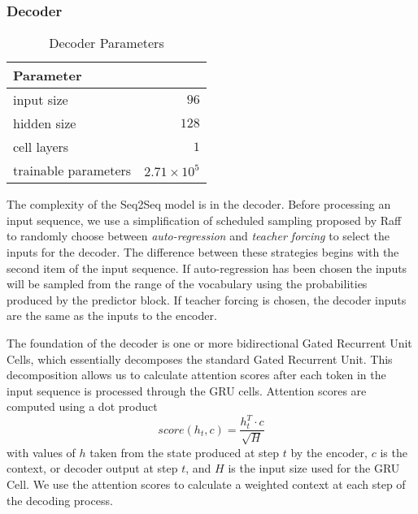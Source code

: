 \subsubsection{Decoder}
\begin{table}[h]
  \caption{Decoder Parameters}
  \label{tab:ae_decoder}
  \begin{tabular}{p{} r}
    \toprule
    Parameter & \\
    \midrule
    input size & $96$ \\
    hidden size & $128$ \\
    cell layers & $1$ \\ 
    \midrule
    trainable parameters &  $2.71 \times 10^{5}$ \\
    \bottomrule
  \end{tabular}
\end{table}
The complexity of the Seq2Seq model is in the decoder. Before processing an input sequence, we use a simplification of scheduled sampling proposed by Raff~\cite{raff_inside_2021} to randomly choose between \textit{auto-regression} and \textit{teacher forcing} to select the inputs for the decoder. The difference between these strategies begins with the second item of the input sequence. If auto-regression has been chosen the inputs will be sampled from the range of the vocabulary using the probabilities produced by the predictor block.  If teacher forcing is chosen, the decoder inputs are the same as the inputs to the encoder. 

The foundation of the decoder is one or more bidirectional Gated Recurrent Unit Cells, which essentially decomposes the standard Gated Recurrent Unit. This decomposition allows us to calculate attention scores after each token in the input sequence is processed through the GRU cells. Attention scores are computed using a dot product
\begin{equation} \label{eq:1}
score(h_t, c) = \frac{h^T_t \cdot c}{\sqrt{H}}
\end{equation}
with values of $h$ taken from the state produced at step $t$ by the encoder, $c$ is the context, or decoder output at step $t$, and $H$ is the input size used for the GRU Cell. We use the attention scores to calculate a weighted context at each step of the decoding process.

